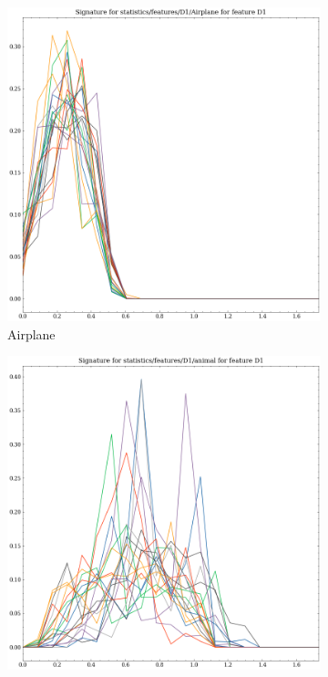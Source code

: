 \begin{figure}[t!p]
    \centering
    \begin{subfigure}[b]{0.23\textwidth}
        \includegraphics[width=\textwidth]{assets/feature_extraction/D1/Airplane.png}
        \caption{Airplane}
        \label{fig:features-statistics-D1-a}    
    \end{subfigure}
    \hfill
    \begin{subfigure}[b]{0.23\textwidth}
        \includegraphics[width=\textwidth]{assets/feature_extraction/D1/animal.png}

\end{subfigure}
\end{figure}
